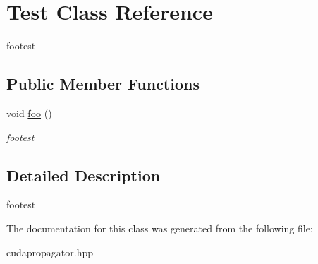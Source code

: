 \hypertarget{structTest}{}\section{Test Class Reference}
\label{structTest}


footest  


\subsection*{Public Member Functions}
\begin{DoxyCompactItemize}
\item 
void \hyperlink{structTest_a09d1d148c3624a636b7590f8cf816a55}{foo} ()\hypertarget{structTest_a09d1d148c3624a636b7590f8cf816a55}{}\label{structTest_a09d1d148c3624a636b7590f8cf816a55}

\begin{DoxyCompactList}\small\item\em footest \end{DoxyCompactList}\end{DoxyCompactItemize}


\subsection{Detailed Description}
footest 

The documentation for this class was generated from the following file\+:\begin{DoxyCompactItemize}
\item 
cudapropagator.\+hpp\end{DoxyCompactItemize}
